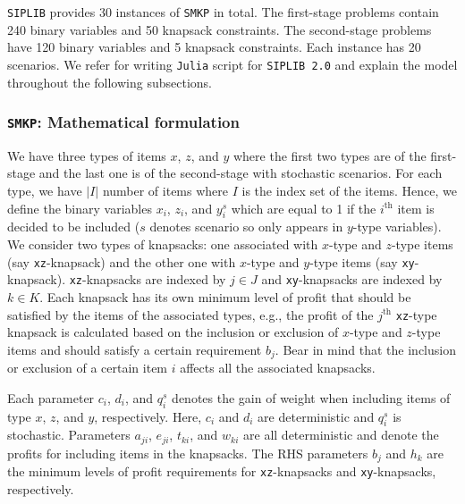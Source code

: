 \texttt{SIPLIB} provides 30 instances of \texttt{SMKP} in total. The first-stage problems contain 240 binary variables and 50 knapsack constraints. The second-stage problems have 120 binary variables and 5 knapsack constraints. Each instance has 20 scenarios. 
We refer \cite{journal:AAD2014} for writing \texttt{Julia} script for \texttt{SIPLIB 2.0} and explain the model throughout the following subsections.
\subsubsection{\texttt{SMKP}: Mathematical formulation}
We have three types of items $x$, $z$, and $y$ where the first two types are of the first-stage and the last one is of the second-stage with stochastic scenarios. For each type, we have $|I|$ number of items where $I$ is the index set of the items. Hence, we define the binary variables $x_i$, $z_i$, and $y_i^s$ which are equal to 1 if the $i^{\mathrm{th}}$ item is decided to be included ($s$ denotes scenario so only appears in $y$-type variables). We consider two types of knapsacks: one associated with $x$-type and $z$-type items (say \texttt{xz}-knapsack) and the other one with $x$-type and $y$-type items (say \texttt{xy}-knapsack). \texttt{xz}-knapsacks are indexed by $j\in J$ and \texttt{xy}-knapsacks are indexed by $k\in K$.  Each knapsack has its own minimum level of profit that should be satisfied by the items of the associated types, e.g., the profit of the $j^{\mathrm{th}}$ \texttt{xz}-type knapsack is calculated based on the inclusion or exclusion of $x$-type and $z$-type items and should satisfy a certain requirement $b_j$. Bear in mind that the inclusion or exclusion of a certain item $i$ affects all the associated knapsacks.
 
Each parameter $c_i$, $d_i$, and $q_i^s$ denotes the gain of weight when including items of type $x$, $z$, and $y$, respectively. Here, $c_i$ and $d_i$ are deterministic and $q_i^s$ is stochastic. Parameters $a_{ji}$, $e_{ji}$, $t_{ki}$, and $w_{ki}$ are all deterministic and denote the profits for including items in the knapsacks. The RHS parameters $b_j$ and $h_k$ are the minimum levels of profit requirements for \texttt{xz}-knapsacks and \texttt{xy}-knapsacks, respectively.

